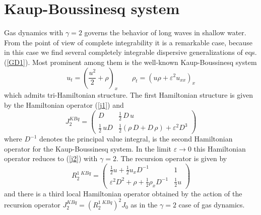 \documentclass[a4paper,12pt]{article}
\begin{document}
\section{Kaup-Boussinesq system}

Gas dynamics with $\gamma = 2$ governs the behavior of long waves
in shallow water. From the point of view of complete integrability
it is a remarkable case, because in this case we find several
completely integrable dispersive generalizations of
eqs.(\ref{GD1}). Most prominent among them is the well-known
Kaup-Boussinesq system \cite{kaup1}
\begin{equation}
u_{t} = \left(\frac{u^{2}}{2}+\rho \right)_x \qquad  \rho_{t} =
\left(u\rho +\varepsilon ^{2}u_{xx} \right)_x \label{kbous}
\end{equation}
which admits tri-Hamiltonian structure. The first Hamiltonian
structure is given by the Hamiltonian operator (\ref{j1}) and
\begin{equation}
J_{2}^{KBq} = \left( \begin{array}{cc} D & \frac{1}{2} \, D \, u
\\[2mm] \frac{1}{2} \, u D &  \frac{1}{2}
( \rho \, D + D \, \rho ) + \varepsilon^{2} D^{3}
\end{array} \right)
\label{j2kbq}
\end{equation}
where $D^{-1}$ denotes the principal value integral, is the second
Hamiltonian operator for the Kaup-Boussinesq system. In the limit
$\varepsilon \rightarrow 0$ this Hamiltonian operator reduces to
(\ref{j2}) with $\gamma=2$. The recursion operator is given by
\begin{equation}
R^{1 \; K Bq}_{2} =\left(
\begin{array}{cc}
\frac{1}{2}u+\frac{1}{2}u_{x} D^{-1} & 1 \\ \varepsilon ^{2}
D^{2}+\rho +\frac{1}{2}\rho _{x} D^{-1} & \frac{1}{2}u
\end{array} \right)
\end{equation}
and there is a third local Hamiltonian operator obtained by the
action of the recursion operator $J_{2}^{KBq}= (R^{1 \; K
Bq}_{2})^2 J_0$ as in the $\gamma=2$ case of gas dynamics.
\end{document}
